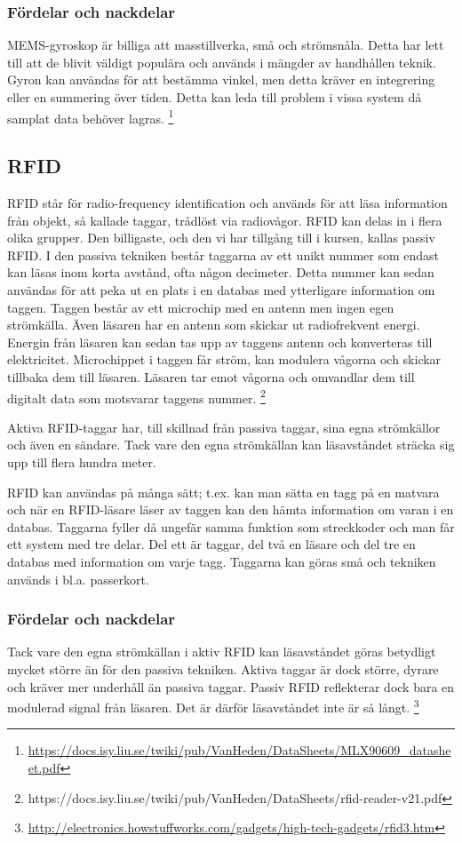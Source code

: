 \documentclass[a4paper,12pt,fleqn]{article}
\begin{document}
\subsubsection{Fördelar och nackdelar}
MEMS-gyroskop är billiga att masstillverka, små och strömsnåla. Detta har lett till att de blivit väldigt populära och används i mängder av handhållen teknik.
Gyron kan användas för att bestämma vinkel, men detta kräver en integrering eller en summering över tiden. Detta kan leda till problem i vissa system då samplat data behöver lagras.
\footnote{\url{https://docs.isy.liu.se/twiki/pub/VanHeden/DataSheets/MLX90609_datasheet.pdf}}

\subsection{RFID}
RFID står för radio-frequency identification och används för att läsa information från objekt, så kallade taggar, trådlöst via radiovågor. RFID kan delas in i flera olika grupper. Den billigaste, och den vi har tillgång till i kursen, kallas passiv RFID. I den passiva tekniken består taggarna av ett unikt nummer som endast kan läsas inom korta avstånd, ofta någon decimeter. Detta nummer kan sedan användas för att peka ut en plats i en databas med ytterligare information om taggen. Taggen består av ett microchip med en antenn men ingen egen strömkälla. Även läsaren har en antenn som skickar ut radiofrekvent energi. Energin från läsaren kan sedan tas upp av taggens antenn och konverteras till elektricitet. Microchippet i taggen får ström, kan modulera vågorna och skickar tillbaka dem till läsaren. Läsaren tar emot vågorna och omvandlar dem till digitalt data som motsvarar taggens nummer.
\footnote{https://docs.isy.liu.se/twiki/pub/VanHeden/DataSheets/rfid-reader-v21.pdf}

Aktiva RFID-taggar har, till skillnad från passiva taggar, sina egna strömkällor och även en sändare. Tack vare den egna strömkällan kan läsavståndet sträcka sig upp till flera hundra meter.

RFID kan användas på många sätt; t.ex. kan man sätta en tagg på en matvara och när en RFID-läsare läser av taggen kan den hämta information om varan i en databas. Taggarna fyller då ungefär samma funktion som streckkoder och man får ett system med tre delar. Del ett är taggar, del två en läsare och del tre en databas med information om varje tagg. Taggarna kan göras små och tekniken används i bl.a. passerkort.

\subsubsection{Fördelar och nackdelar}
Tack vare den egna strömkällan i aktiv RFID kan läsavståndet göras betydligt mycket större än för den passiva tekniken. Aktiva taggar är dock större, dyrare och kräver mer underhåll än passiva taggar. Passiv RFID reflekterar dock bara en modulerad signal från läsaren. Det är därför läsavståndet inte är så långt.
\footnote{\url{http://electronics.howstuffworks.com/gadgets/high-tech-gadgets/rfid3.htm}}
\end{document}
